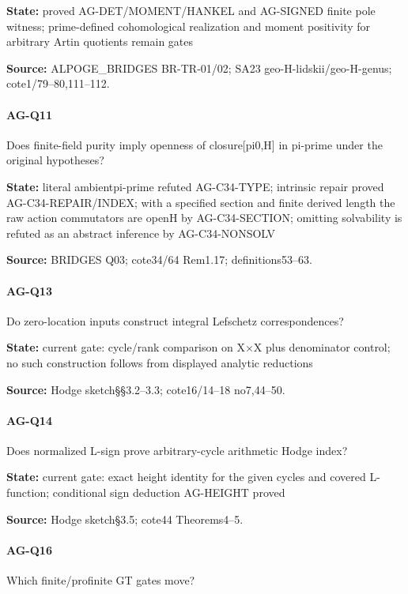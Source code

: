 \documentclass[11pt,a4paper]{article}
\begin{document}
\textbf{State:} proved AG-DET/\allowbreak{}MOMENT/\allowbreak{}HANKEL and AG-SIGNED finite pole witness; prime-defined cohomological realization and moment positivity for arbitrary Artin quotients remain gates

\textbf{Source:} ALPOGE\_\allowbreak{}BRIDGES BR-TR-01/\allowbreak{}02; SA23 geo-H-lidskii/\allowbreak{}geo-H-genus; cote1/\allowbreak{}79–\allowbreak{}80,111–\allowbreak{}112.

\paragraph{AG-Q11} Does finite-field purity imply openness of closure[pi0,H] in pi-prime under the original hypotheses?

\textbf{State:} literal ambientpi-prime refuted AG-C34-TYPE; intrinsic repair proved AG-C34-REPAIR/\allowbreak{}INDEX; with a specified section and finite derived length the raw action commutators are openH by AG-C34-SECTION; omitting solvability is refuted as an abstract inference by AG-C34-NONSOLV

\textbf{Source:} BRIDGES Q03; cote34/\allowbreak{}64 Rem1.\allowbreak{}17; definitions53–\allowbreak{}63.

\paragraph{AG-Q13} Do zero-location inputs construct integral Lefschetz correspondences?

\textbf{State:} current gate:\allowbreak{} cycle/\allowbreak{}rank comparison on X×X plus denominator control; no such construction follows from displayed analytic reductions

\textbf{Source:} Hodge sketch§§3.\allowbreak{}2–\allowbreak{}3.\allowbreak{}3; cote16/\allowbreak{}14–\allowbreak{}18 no7,44–\allowbreak{}50.

\paragraph{AG-Q14} Does normalized L-sign prove arbitrary-cycle arithmetic Hodge index?

\textbf{State:} current gate:\allowbreak{} exact height identity for the given cycles and covered L-function; conditional sign deduction AG-HEIGHT proved

\textbf{Source:} Hodge sketch§3.\allowbreak{}5; cote44 Theorems4–\allowbreak{}5.

\paragraph{AG-Q16} Which finite/\allowbreak{}profinite GT gates move?
\end{document}
